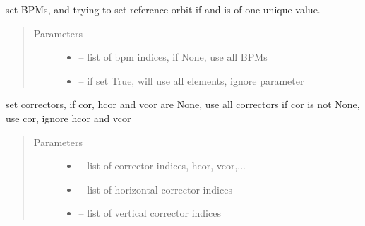 \documentclass[letterpaper,10pt,english]{sphinxmanual}
\begin{document}
\begin{fulllineitems}

\begin{fulllineitems}
\label{\detokenize{src/apidocs/genopt:genopt.DakotaOC.set_bpms}}
set BPMs, and trying to set reference orbit  if  and 
is of one unique value.
\begin{quote}\begin{description}
\item[{Parameters}] \leavevmode\begin{itemize}
\item {} 
 -- list of bpm indices, if None, use all BPMs

\item {} 
 -- if set True, will use all elements, ignore  parameter

\end{itemize}

\end{description}\end{quote}

\end{fulllineitems}


\begin{fulllineitems}
\label{\detokenize{src/apidocs/genopt:genopt.DakotaOC.set_cors}}
set correctors, if cor, hcor and vcor are None, use all correctors
if cor is not None, use cor, ignore hcor and vcor
\begin{quote}\begin{description}
\item[{Parameters}] \leavevmode\begin{itemize}
\item {} 
 -- list of corrector indices, hcor, vcor,...

\item {} 
 -- list of horizontal corrector indices

\item {} 
 -- list of vertical corrector indices

\end{itemize}


\end{description}
\end{quote}
\end{fulllineitems}
\end{fulllineitems}
\end{document}
